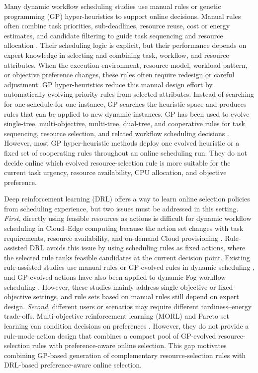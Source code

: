 \documentclass[10pt,journal]{IEEEtran}
\begin{document}
Many dynamic workflow scheduling studies use manual rules or genetic programming (GP) hyper-heuristics to support online decisions. Manual rules often combine task priorities, sub-deadlines, resource reuse, cost or energy estimates, and candidate filtering to guide task sequencing and resource allocation \cite{ohds,rmes,li2024,lou2023,lwff}. Their scheduling logic is explicit, but their performance depends on expert knowledge in selecting and combining task, workflow, and resource attributes. When the execution environment, resource model, workload pattern, or objective preference changes, these rules often require redesign or careful adjustment. GP hyper-heuristics reduce this manual design effort by automatically evolving priority rules from selected attributes. Instead of searching for one schedule for one instance, GP searches the heuristic space and produces rules that can be applied to new dynamic instances. GP has been used to evolve single-tree, multi-objective, multi-tree, dual-tree, and cooperative rules for task sequencing, resource selection, and related workflow scheduling decisions \cite{escott2020gphh,yu2022mogp,xu2023mtgp,sun2024mtgp,yang2025dtgp,ccgp}. However, most GP hyper-heuristic methods deploy one evolved heuristic or a fixed set of cooperating rules throughout an online scheduling run. They do not decide online which evolved resource-selection rule is more suitable for the current task urgency, resource availability, CPU allocation, and objective preference.

Deep reinforcement learning (DRL) offers a way to learn online selection policies from scheduling experience, but two issues must be addressed in this setting. \emph{First}, directly using feasible resources as actions is difficult for dynamic workflow scheduling in Cloud--Edge computing because the action set changes with task requirements, resource availability, and on-demand Cloud provisioning \cite{jayanetti2022,xiao2025,gates}. Rule-assisted DRL avoids this issue by using scheduling rules as fixed actions, where the selected rule ranks feasible candidates at the current decision point. Existing rule-assisted studies use manual rules or GP-evolved rules in dynamic scheduling \cite{liu2022rules,xu2024niching,zhao2025tdrl}, and GP-evolved actions have also been applied to dynamic Fog workflow scheduling \cite{he2026evolved}. However, these studies mainly address single-objective or fixed-objective settings, and rule sets based on manual rules still depend on expert design. \emph{Second}, different users or scenarios may require different tardiness--energy trade-offs. Multi-objective reinforcement learning (MORL) and Pareto set learning can condition decisions on preferences \cite{roijers2013morl,hayes2022morl,abels2019morl,yang2019morl,lin2022psl,xu2026pslgp}. However, they do not provide a rule-mode action design that combines a compact pool of GP-evolved resource-selection rules with preference-aware online selection. This gap motivates combining GP-based generation of complementary resource-selection rules with DRL-based preference-aware online selection.
\end{document}
